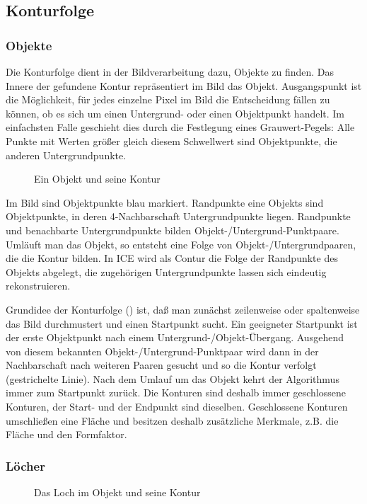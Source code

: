
\subsection{Konturfolge}
\label{Konturen}

\subsubsection{Objekte}
Die Konturfolge dient in der Bildverarbeitung dazu, Objekte zu finden. Das
Innere der gefundene Kontur repräsentiert im Bild das Objekt. Ausgangspunkt
ist die Möglichkeit, für jedes einzelne Pixel im Bild die Entscheidung fällen
zu können, ob es sich um einen Untergrund- oder einen Objektpunkt handelt. Im
einfachsten Falle geschieht dies durch die Festlegung eines Grauwert-Pegels:
Alle Punkte mit Werten größer gleich diesem Schwellwert sind Objektpunkte,
die anderen Untergrundpunkte.

\begin{figure}[h]
  \label{object}
  \caption{Ein Objekt und seine Kontur}
\end{figure}

Im Bild sind Objektpunkte blau markiert. Randpunkte eine Objekts
sind Objektpunkte, in deren 4-Nachbarschaft Untergrundpunkte
liegen. Randpunkte und benachbarte Untergrundpunkte bilden
Objekt-/Untergrund-Punktpaare. Umläuft man das Objekt, so entsteht eine Folge
von Objekt-/Untergrundpaaren, die die Kontur bilden. In ICE wird als Contur
die Folge der Randpunkte des Objekts abgelegt, die zugehörigen Untergrundpunkte
lassen sich eindeutig rekonstruieren.

Grundidee der Konturfolge ({}) ist, daß man zunächst 
zeilenweise oder spaltenweise das Bild durchmustert und einen Startpunkt 
sucht. Ein geeigneter Startpunkt ist der erste Objektpunkt nach einem
Untergrund-/Objekt-Übergang. Ausgehend von diesem bekannten
Objekt-/Untergrund-Punktpaar wird dann in der Nachbarschaft nach weiteren
Paaren gesucht und so die Kontur verfolgt (gestrichelte Linie). Nach dem
Umlauf um das Objekt kehrt der Algorithmus immer zum Startpunkt zurück. Die
Konturen sind deshalb immer geschlossene Konturen, der Start- und der Endpunkt
sind dieselben. Geschlossene Konturen umschließen eine Fläche und besitzen
deshalb zusätzliche Merkmale, z.B. die Fläche und den Formfaktor.

\subsubsection{Löcher}
\begin{figure}[h]
  \label{fig:hole}
  \caption{Das Loch im Objekt und seine Kontur}
\end{figure}

